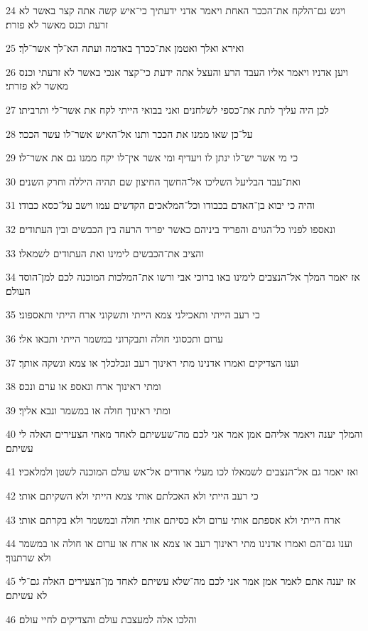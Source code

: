 \par 24 ויגש גם־הלקח את־הככר האחת ויאמר אדני ידעתיך כי־איש קשה אתה קצר באשר לא זרעת וכנס מאשר לא פזרת׃
\par 25 ואירא ואלך ואטמן את־ככרך באדמה ועתה הא־לך אשר־לך׃
\par 26 ויען אדניו ויאמר אליו העבד הרע והעצל אתה ידעת כי־קצר אנכי באשר לא זרעתי וכנס מאשר לא פזרתי׃
\par 27 לכן היה עליך לתת את־כספי לשלחנים ואני בבואי הייתי לקח את אשר־לי ותרביתו׃
\par 28 על־כן שאו ממנו את הככר ותנו אל־האיש אשר־לו עשר הככר׃
\par 29 כי מי אשר יש־לו ינתן לו ויעדיף ומי אשר אין־לו יקח ממנו גם את אשר־לו׃
\par 30 ואת־עבד הבליעל השליכו אל־החשך החיצון שם תהיה היללה וחרק השנים׃
\par 31 והיה כי יבוא בן־האדם בכבודו וכל־המלאכים הקדשים עמו וישב על־כסא כבודו׃
\par 32 ונאספו לפניו כל־הגוים והפריד ביניהם כאשר יפריד הרעה בין הכבשים ובין העתודים׃
\par 33 והציב את־הכבשים לימינו ואת העתודים לשמאלו׃
\par 34 אז יאמר המלך אל־הנצבים לימינו באו ברוכי אבי ורשו את־המלכות המוכנה לכם למן־הוסד העולם׃
\par 35 כי רעב הייתי ותאכילני צמא הייתי ותשקוני ארח הייתי ותאספוני׃
\par 36 ערום ותכסוני חולה ותבקרוני במשמר הייתי ותבאו אלי׃
\par 37 וענו הצדיקים ואמרו אדנינו מתי ראינוך רעב ונכלכלך או צמא ונשקה אותך׃
\par 38 ומתי ראינוך ארח ונאספ או ערם ונכס׃
\par 39 ומתי ראינוך חולה או במשמר ונבא אליך׃
\par 40 והמלך יענה ויאמר אליהם אמן אמר אני לכם מה־שעשיתם לאחד מאחי הצעירים האלה לי עשיתם׃
\par 41 ואז יאמר גם אל־הנצבים לשמאלו לכו מעלי ארורים אל־אש עולם המוכנה לשטן ולמלאכיו׃
\par 42 כי רעב הייתי ולא האכלתם אותי צמא הייתי ולא השקיתם אותי׃
\par 43 ארח הייתי ולא אספתם אותי ערום ולא כסיתם אותי חולה ובמשמר ולא בקרתם אותי׃
\par 44 וענו גם־הם ואמרו אדנינו מתי ראינוך רעב או צמא או ארח או ערום או חולה או במשמר ולא שרתנוך׃
\par 45 אז יענה אתם לאמר אמן אמר אני לכם מה־שלא עשיתם לאחד מן־הצעירים האלה גם־לי לא עשיתם׃
\par 46 והלכו אלה למעצבת עולם והצדיקים לחיי עולם׃

